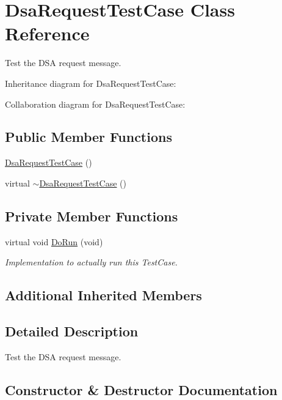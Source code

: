 \hypertarget{classDsaRequestTestCase}{}\section{Dsa\+Request\+Test\+Case Class Reference}
\label{classDsaRequestTestCase}


Test the D\+SA request message.  




Inheritance diagram for Dsa\+Request\+Test\+Case\+:


Collaboration diagram for Dsa\+Request\+Test\+Case\+:
\subsection*{Public Member Functions}
\begin{DoxyCompactItemize}
\item 
\hyperlink{classDsaRequestTestCase_aff9a1109ddcc221eaa6998c14cfc7aea}{Dsa\+Request\+Test\+Case} ()
\item 
virtual \hyperlink{classDsaRequestTestCase_aae600d1a4d9b14f523edb420fc088de2}{$\sim$\+Dsa\+Request\+Test\+Case} ()
\end{DoxyCompactItemize}
\subsection*{Private Member Functions}
\begin{DoxyCompactItemize}
\item 
virtual void \hyperlink{classDsaRequestTestCase_a03d674bc8be475390afde9769e45199c}{Do\+Run} (void)
\begin{DoxyCompactList}\small\item\em Implementation to actually run this Test\+Case. \end{DoxyCompactList}\end{DoxyCompactItemize}
\subsection*{Additional Inherited Members}


\subsection{Detailed Description}
Test the D\+SA request message. 

\subsection{Constructor \& Destructor Documentation}
